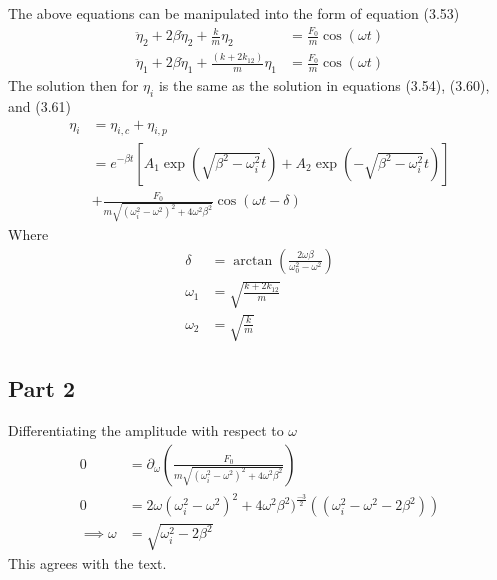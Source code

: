 The above equations can be manipulated into the form of equation (3.53)
\begin{equation}
    \begin{split}
        \ddot{\eta}_2  +2\beta \dot{\eta}_2+ \frac{k}{m}\eta_2 &= \frac{F_0}{m} \cos(\omega t)\\
        \ddot{\eta}_1 + 2\beta \dot{\eta}_1+ \frac{(k + 2k_{12})}{m}\eta_1  &= \frac{F_0}{m} \cos(\omega t)
    \end{split}
\end{equation}
The solution then for $\eta_i$ is the same as the solution in equations (3.54), (3.60), and (3.61)
\begin{equation}
    \begin{split}
            \eta_i &= \eta_{i,c} + \eta_{i,p}\\
                &= e^{-\beta t}\left [ A_1 \exp(\sqrt{\beta^2-\omega_i^2}t)+A_2\exp(-\sqrt{\beta^2-\omega_i^2}t)\right ]\\
                &+\frac{F_0}{m\sqrt{(\omega_i^2-\omega^2)^2+4\omega^2 \beta^2}}\cos(\omega t -\delta)
    \end{split}
\end{equation}
Where
\begin{equation}
    \begin{split}
        \delta &= \arctan \left ( \frac{2\omega \beta}{\omega_0^2-\omega^2}\right )\\
        \omega_1 &= \sqrt{\frac{k+2k_{12}}{m}}\\ 
        \omega_2 &= \sqrt{\frac{k}{m}}
    \end{split}
\end{equation}

\subsection{Part 2}
Differentiating the amplitude with respect to $\omega$
\begin{equation}
\begin{split}
    0 & =\partial_\omega \left ( \frac{F_0}{m\sqrt{(\omega_i^2-\omega^2)^2+4\omega^2 \beta^2}} \right )\\
    0&= 2\omega(\omega_i^2 - \omega^2)^2+4\omega^2 \beta^2)^\frac{-3}{2}((\omega_i^2-\omega^2-2\beta^2))\\
    \implies \omega &= \sqrt{\omega_i^2-2\beta^2}
\end{split}
\end{equation}
This agrees with the text.
